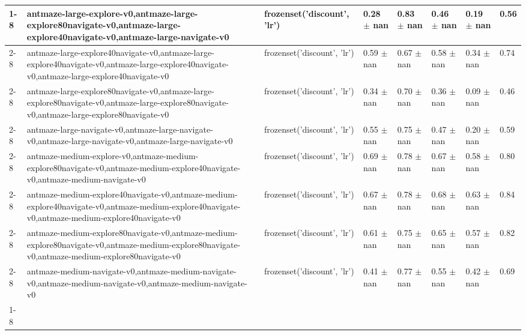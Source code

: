 \begin{tabular}{llllllll}
\cline{1-8} \cline{2-8}
\multirow[t]{8}{*}{QRL} & antmaze-large-explore-v0,antmaze-large-explore80navigate-v0,antmaze-large-explore40navigate-v0,antmaze-large-navigate-v0 & frozenset({'discount', 'lr'}) & 0.28 $\pm$ nan & 0.83 $\pm$ nan & 0.46 $\pm$ nan & 0.19 $\pm$ nan & 0.56 \\
\cline{2-8}
 & antmaze-large-explore40navigate-v0,antmaze-large-explore40navigate-v0,antmaze-large-explore40navigate-v0,antmaze-large-explore40navigate-v0 & frozenset({'discount', 'lr'}) & 0.59 $\pm$ nan & 0.67 $\pm$ nan & 0.58 $\pm$ nan & 0.34 $\pm$ nan & 0.74 \\
\cline{2-8}
 & antmaze-large-explore80navigate-v0,antmaze-large-explore80navigate-v0,antmaze-large-explore80navigate-v0,antmaze-large-explore80navigate-v0 & frozenset({'discount', 'lr'}) & 0.34 $\pm$ nan & 0.70 $\pm$ nan & 0.36 $\pm$ nan & 0.09 $\pm$ nan & 0.46 \\
\cline{2-8}
 & antmaze-large-navigate-v0,antmaze-large-navigate-v0,antmaze-large-navigate-v0,antmaze-large-navigate-v0 & frozenset({'discount', 'lr'}) & 0.55 $\pm$ nan & 0.75 $\pm$ nan & 0.47 $\pm$ nan & 0.20 $\pm$ nan & 0.59 \\
\cline{2-8}
 & antmaze-medium-explore-v0,antmaze-medium-explore80navigate-v0,antmaze-medium-explore40navigate-v0,antmaze-medium-navigate-v0 & frozenset({'discount', 'lr'}) & 0.69 $\pm$ nan & 0.78 $\pm$ nan & 0.67 $\pm$ nan & 0.58 $\pm$ nan & 0.80 \\
\cline{2-8}
 & antmaze-medium-explore40navigate-v0,antmaze-medium-explore40navigate-v0,antmaze-medium-explore40navigate-v0,antmaze-medium-explore40navigate-v0 & frozenset({'discount', 'lr'}) & 0.67 $\pm$ nan & 0.78 $\pm$ nan & 0.68 $\pm$ nan & 0.63 $\pm$ nan & 0.84 \\
\cline{2-8}
 & antmaze-medium-explore80navigate-v0,antmaze-medium-explore80navigate-v0,antmaze-medium-explore80navigate-v0,antmaze-medium-explore80navigate-v0 & frozenset({'discount', 'lr'}) & 0.61 $\pm$ nan & 0.75 $\pm$ nan & 0.65 $\pm$ nan & 0.57 $\pm$ nan & 0.82 \\
\cline{2-8}
 & antmaze-medium-navigate-v0,antmaze-medium-navigate-v0,antmaze-medium-navigate-v0,antmaze-medium-navigate-v0 & frozenset({'discount', 'lr'}) & 0.41 $\pm$ nan & 0.77 $\pm$ nan & 0.55 $\pm$ nan & 0.42 $\pm$ nan & 0.69 \\
\cline{1-8} \cline{2-8}
\bottomrule
\end{tabular}

